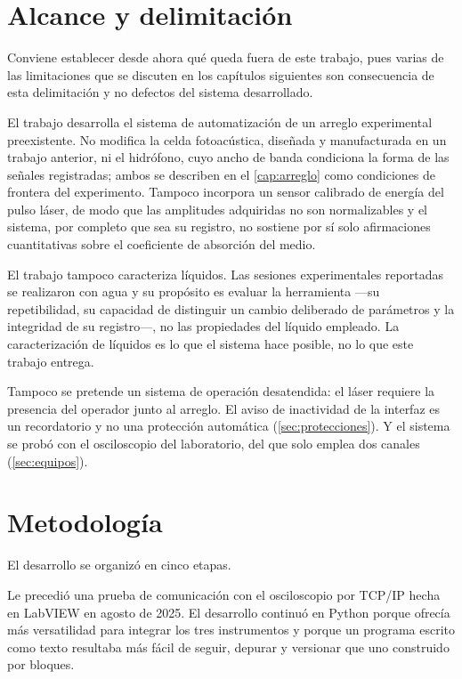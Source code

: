 \section{Alcance y delimitación}
\label{sec:alcance}

Conviene establecer desde ahora qué queda fuera de este trabajo, pues
varias de las limitaciones que se discuten en los capítulos siguientes
son consecuencia de esta delimitación y no defectos del sistema
desarrollado.

El trabajo desarrolla el sistema de automatización de un arreglo
experimental preexistente. No modifica la celda fotoacústica, diseñada y
manufacturada en un trabajo anterior, ni el hidrófono, cuyo ancho de
banda condiciona la forma de las señales registradas; ambos se describen
en el \cref{cap:arreglo} como condiciones de frontera del experimento.
Tampoco incorpora un sensor calibrado de energía del pulso láser, de
modo que las amplitudes adquiridas no son normalizables y el sistema, por
completo que sea su registro, no sostiene por sí solo afirmaciones
cuantitativas sobre el coeficiente de absorción del medio.

El trabajo tampoco caracteriza líquidos. Las sesiones experimentales
reportadas se realizaron con agua y su propósito es evaluar la
herramienta —su repetibilidad, su capacidad de distinguir un cambio
deliberado de parámetros y la integridad de su registro—, no las
propiedades del líquido empleado. La caracterización de líquidos es lo
que el sistema hace posible, no lo que este trabajo entrega.

Tampoco se pretende un sistema de operación desatendida: el láser
requiere la presencia del operador junto al arreglo. El aviso de
inactividad de la interfaz es un recordatorio y no una protección
automática (\cref{sec:protecciones}). Y el sistema se probó con el
osciloscopio del laboratorio, del que solo emplea dos canales
(\cref{sec:equipos}).

\section{Metodología}
\label{sec:metodologia}

El desarrollo se organizó en cinco etapas.

Le precedió una prueba de comunicación con el osciloscopio por TCP/IP
hecha en LabVIEW en agosto de 2025. El desarrollo continuó en Python
porque ofrecía más versatilidad para integrar los tres instrumentos y
porque un programa escrito como texto resultaba más fácil de seguir,
depurar y versionar que uno construido por bloques.

